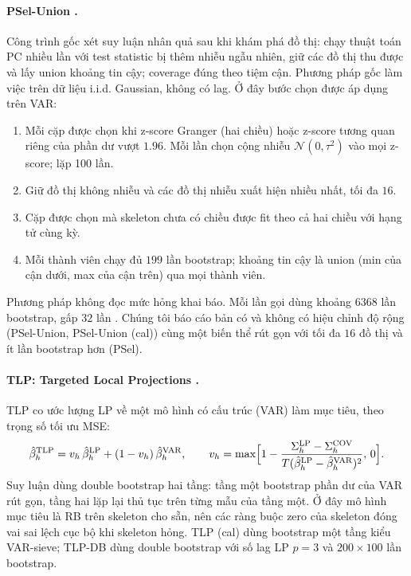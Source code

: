 \paragraph{PSel-Union \citep{chang2026post}.}
Công trình gốc xét suy luận nhân quả sau khi khám phá đồ thị: chạy thuật toán PC nhiều lần với test statistic bị thêm nhiễu ngẫu nhiên, giữ các đồ thị thu được và lấy union khoảng tin cậy; coverage đúng theo tiệm cận. Phương pháp gốc làm việc trên dữ liệu i.i.d. Gaussian, không có lag. Ở đây bước chọn được áp dụng trên VAR:
\begin{enumerate}
  \item Mỗi cặp được chọn khi z-score Granger (hai chiều) hoặc z-score tương quan riêng của phần dư vượt $1.96$. Mỗi lần chọn cộng nhiễu $\mathcal N(0,\tau^2)$ vào mọi z-score; lặp 100 lần.
  \item Giữ đồ thị không nhiễu và các đồ thị nhiễu xuất hiện nhiều nhất, tối đa $16$.
  \item Cặp được chọn mà skeleton chưa có chiều được fit theo cả hai chiều với hạng tử cùng kỳ.
  \item Mỗi thành viên chạy đủ $199$ lần bootstrap; khoảng tin cậy là union (min của cận dưới, max của cận trên) qua mọi thành viên.
\end{enumerate}
Phương pháp không đọc mức hỏng khai báo. Mỗi lần gọi dùng khoảng $6368$ lần bootstrap, gấp $32$ lần \ours{}. Chúng tôi báo cáo bản có và không có hiệu chỉnh độ rộng (PSel-Union, PSel-Union (cal)) cùng một biến thể rút gọn với tối đa $16$ đồ thị và ít lần bootstrap hơn (PSel).

\paragraph{TLP: Targeted Local Projections \citep{nemtyrev2026targeted}.}
TLP co ước lượng LP về một mô hình có cấu trúc (VAR) làm mục tiêu, theo trọng số tối ưu MSE:
\begin{equation}
\hat\beta^{\mathrm{TLP}}_h=v_h\,\hat\beta^{\mathrm{LP}}_h+(1-v_h)\,\hat\beta^{\mathrm{VAR}}_h,\qquad
v_h=\max\Bigl[1-\frac{\Sigma^{\mathrm{LP}}_h-\Sigma^{\mathrm{COV}}_h}{T(\hat\beta^{\mathrm{LP}}_h-\hat\beta^{\mathrm{VAR}}_h)^2},\,0\Bigr].
\end{equation}
Suy luận dùng double bootstrap hai tầng: tầng một bootstrap phần dư của VAR rút gọn, tầng hai lặp lại thủ tục trên từng mẫu của tầng một. Ở đây mô hình mục tiêu là RB trên skeleton cho sẵn, nên các ràng buộc zero của skeleton đóng vai sai lệch cục bộ khi skeleton hỏng. TLP (cal) dùng bootstrap một tầng kiểu VAR-sieve; TLP-DB dùng double bootstrap với số lag LP $p=3$ và $200\times100$ lần bootstrap.

